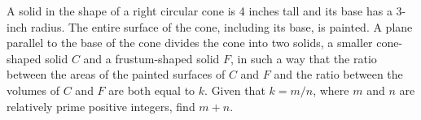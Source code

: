 A solid in the shape of a right circular cone is 4 inches tall and its base has a 3-inch radius. The entire surface of the cone, including its base, is painted. A plane parallel to the base of the cone divides the cone into two solids, a smaller cone-shaped solid $C$ and a frustum-shaped solid $F$, in such a way that the ratio between the areas of the painted surfaces of $C$ and $F$ and the ratio between the volumes of $C$ and $F$ are both equal to $k$. Given that $k=m/n$, where $m$ and $n$ are relatively prime positive integers, find $m+n$.
